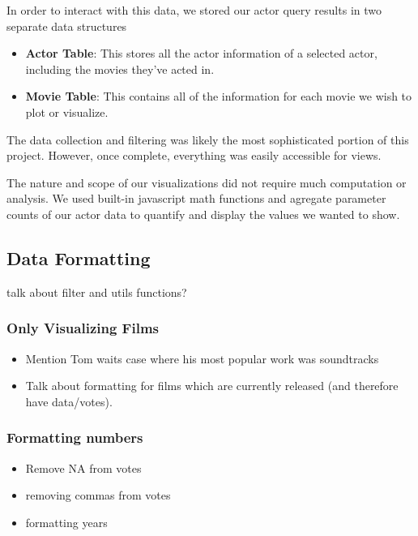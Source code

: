 \documentclass[12pt]{article}
\begin{document}
	In order to interact with this data, we stored our actor query results in two separate data structures
	\begin{itemize}
		\item \textbf{Actor Table}: This stores all the actor information of a selected actor, including the movies they've acted in.
		\item \textbf{Movie Table}: This contains all of the information for each movie we wish to plot or visualize.
	\end{itemize}

	The data collection and filtering was likely the most sophisticated portion of this project. However, once complete, everything was easily accessible for views.  
	
	The nature and scope of our visualizations did not require much computation or analysis.  We used built-in javascript math functions and agregate parameter counts of our actor data to quantify and display the values we wanted to show.

\subsection{Data Formatting}

talk about filter and utils functions?
\subsubsection{Only Visualizing Films}
	
	\begin{itemize}
			\item Mention Tom waits case where his most popular work was soundtracks
			\item Talk about formatting for films which are currently released (and therefore have data/votes).
	\end{itemize}
	
\subsubsection{Formatting numbers}
	
	\begin{itemize}
		\item Remove NA from votes
		\item removing commas from votes
		\item formatting years
	\end{itemize}


\newpage 
\end{document}
